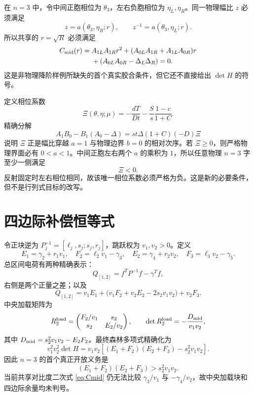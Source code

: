 \documentclass[UTF8,12pt,openany,fontset=fandol]{ctexrep}
\theoremstyle{definition}
\begin{document}
在 $n=3$ 中，令中间正胞相位为 $\theta_3$，左右负胞相位为 $\eta_L,\eta_R$。同一物理幅比 $z$ 必须满足
\begin{equation}
 z=a(\theta_3,\eta_R;r),\qquad z^{-1}=a(\theta_3,\eta_L;r).
\end{equation}
所以共享的 $r=\sqrt R$ 必须满足
\begin{align}\label{eq:Cmid}
 C_{\rm mid}(r)={}&A_{1L}A_{1R}r^2
 +(A_{0L}A_{1R}+A_{1L}A_{0R})r\\
 &+(A_{0L}A_{0R}-\Delta_L\Delta_R)=0.\nonumber
\end{align}
这是非物理降阶样例所缺失的首个真实胶合条件，但它还不直接给出 $\det H$ 的符号。

定义相位系数
\begin{equation}
 \Xi(\theta,\eta;\mu)
 =-\frac{dT}{Dt}-\frac{S}{s}\frac{1-c}{1+C}.
\end{equation}
精确分解
\begin{equation}
 A_1B_0-B_1(A_0-\Delta)=s t\Delta(1+C)(-D)\Xi
\end{equation}
说明 $\Xi$ 正是幅比穿越 $a=1$ 与物理边界 $b=0$ 的相对次序。若 $\Xi\ge0$，则严格物理界面必有 $0<a<1$。中间正胞左右两个 $a$ 的乘积为 $1$，所以任意物理 $n=3$ 字至少一侧满足
\begin{equation}
 \Xi<0.
\end{equation}
反射固定时左右相位相同，故该唯一相位系数必须严格为负。这是新的必要条件，但不是行列式目标的改写。

\section{四边际补偿恒等式}

令正块逆为 $P_j^{-1}=[\ell_j,s_j;s_j,r_j]$，跳跃权为 $v_1,v_2>0$。定义
\begin{equation}
 E_1=\gamma_2+r_1v_1,\quad F_2=\ell_2v_1-\gamma_3,\quad
 E_2=\gamma_4+r_2v_2,\quad F_3=\ell_3v_2-\gamma_5.
\end{equation}
总区间电荷有两种精确表示：
\begin{equation}
 Q_{[1,2]}=f^TP^{-1}f-\gamma^Tf,
\end{equation}
右侧是两个正量之差；以及
\begin{equation}
 Q_{[1,2]}=v_1E_1+\bigl(v_1F_2+v_2E_2-2s_2v_1v_2\bigr)+v_2F_3.
\end{equation}
中央加载矩阵为
\begin{equation}
 R_2^{\rm load}=\begin{pmatrix}F_2/v_1&s_2\\s_2&E_2/v_2\end{pmatrix},\qquad
 \det R_2^{\rm load}=-\frac{D_{\rm mid}}{v_1v_2},
\end{equation}
其中 $D_{\rm mid}=s_2^2v_1v_2-E_2F_2$。最终森林多项式精确化为
\begin{equation}\label{eq:fourmargin}
 v_1^2v_2^2\det H
 =v_1v_2\left[(E_1+F_2)(E_2+F_3)-s_2^2v_1v_2\right].
\end{equation}
因此 $n=3$ 的首个真正开放义务是
\begin{equation}
 (E_1+F_2)(E_2+F_3)>s_2^2v_1v_2.
\end{equation}
当前共享对比度二次式 \eqref{eq:Cmid} 仍无法比较 $\gamma_3/v_1$ 与 $-\gamma_4/v_2$，故中央加载块和四边际余量均未判号。
\end{document}
